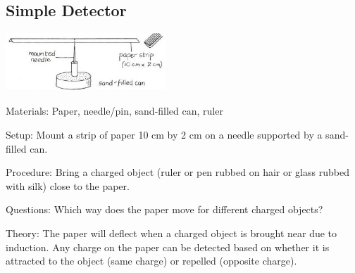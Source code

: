\begin{multicols}{2}
%
%

\subsection{Simple Detector}

\begin{center}
\includegraphics[width=0.45\textwidth]{./img/vso/simple-detector.jpg}
\end{center}

\begin{description*}
\item[Materials:]{Paper, needle/pin, sand-filled can, ruler}
\item[Setup:]{Mount a strip of paper 10 cm by 2 cm on a needle supported by a sand-filled can.}
\item[Procedure:]{Bring a charged object (ruler or pen rubbed on hair or glass rubbed with silk) close to the paper.}
\item[Questions:]{Which way does the paper move for different charged objects?}
\item[Theory:]{The paper will deflect when a charged object is brought near due to induction. Any charge on the paper can be detected based on whether it is attracted to the object (same charge) or repelled (opposite charge).}
\end{description*}


\end{multicols}

